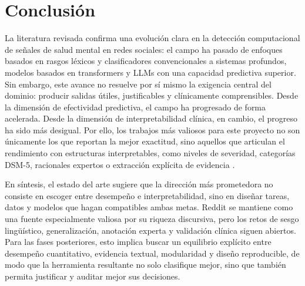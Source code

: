 \section{Conclusión}

La literatura revisada confirma una evolución clara en la detección computacional de señales de salud mental en redes sociales: el campo ha pasado de enfoques basados en rasgos léxicos y clasificadores convencionales a sistemas profundos, modelos basados en transformers y LLMs con una capacidad predictiva superior. Sin embargo, este avance no resuelve por sí mismo la exigencia central del dominio: producir salidas útiles, justificables y clínicamente comprensibles. Desde la dimensión de efectividad predictiva, el campo ha progresado de forma acelerada. Desde la dimensión de interpretabilidad clínica, en cambio, el progreso ha sido más desigual. Por ello, los trabajos más valiosos para este proyecto no son únicamente los que reportan la mejor exactitud, sino aquellos que articulan el rendimiento con estructuras interpretables, como niveles de severidad, categorías DSM-5, racionales expertos o extracción explícita de evidencia \citep{gaur2018dsm5, gaur2019severity, bao2025redsm5, singh2024evidence}.

En síntesis, el estado del arte sugiere que la dirección más prometedora no consiste en escoger entre desempeño e interpretabilidad, sino en diseñar tareas, datos y modelos que hagan compatibles ambas metas. Reddit se mantiene como una fuente especialmente valiosa por su riqueza discursiva, pero los retos de sesgo lingüístico, generalización, anotación experta y validación clínica siguen abiertos. Para las fases posteriores, esto implica buscar un equilibrio explícito entre desempeño cuantitativo, evidencia textual, modularidad y diseño reproducible, de modo que la herramienta resultante no solo clasifique mejor, sino que también permita justificar y auditar mejor sus decisiones.
